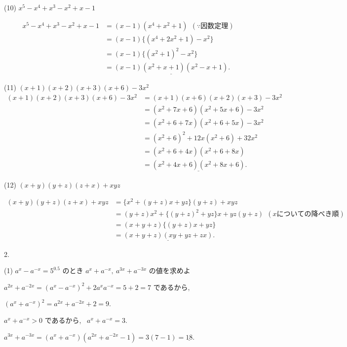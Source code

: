\documentclass[dvipdfmx]{jsarticle}
\begin{document}
\bigskip

(10) $x^5 - x^4 + x^3 - x^2 + x -1$

$$
\begin{aligned}
  x^5 - x^4 + x^3 - x^2 + x -1
  &= (x-1)(x^4 + x^2 + 1) \ \ (\because 因数定理) \\
  &= (x-1)\{(x^4 + 2x^2 + 1) - x^2 \} \\
  &= (x-1)\{(x^2 + 1)^2 - x^2 \} \\
  &= \underline{(x-1)(x^2 + x + 1)(x^2 - x + 1)}.
\end{aligned}
$$

\bigskip

(11) $(x+1)(x+2)(x+3)(x+6) - 3x^2$
$$
\begin{aligned}
  (x+1)(x+2)(x+3)(x+6) - 3x^2
  &= (x+1)(x+6)(x+2)(x+3) - 3x^2 \\
  &= (x^2 + 7x + 6)(x^2 + 5x + 6) -3x^2 \\
  &= (x^2 + 6 + 7x)(x^2 + 6 + 5x) - 3x^2 \\
  &= (x^2 + 6)^2 + 12x(x^2 + 6) +32x^2 \\
  &= (x^2 + 6 + 4x)(x^2 + 6 + 8x) \\
  &= \underline{(x^2 + 4x + 6)(x^2 + 8x + 6)}.
\end{aligned}
$$

\bigskip

(12) $(x+y)(y+z)(z+x) +xyz$

$$
\begin{aligned}
  (x+y)(y+z)(z+x) +xyz
  &= \{x^2 + (y+z)x + yz\}(y+z) + xyz \\
  &= (y+z)x^2 + \{(y+z)^2 + yz\}x + yz(y+z) \ \ (xについての降べき順) \\
  &= (x+y+z)\{(y+z)x  + yz\} \\
  &= \underline{(x+y+z)(xy + yz + zx)}.
\end{aligned}
$$


\newpage

2.

(1) $a^x - a^{-x} = 5^{0.5}$ のとき $a^x + a^{-x}, \ a^{3x} + a^{-3x}$ の値を求めよ

\bigskip

$a^{2x} + a^{-2x} = (a^x - a^{-x})^2 + 2a^x a^{-x} = 5 + 2 = 7$ であるから, \ 

$(a^x + a^{-x})^2 = a^{2x} + a^{-2x} + 2 = 9$.

$a^x + a^{-x} > 0$ であるから, \ \underline{$a^x + a^{-x} = 3$}.

$a^{3x} + a^{-3x} = (a^x + a^{-x})(a^{2x} + a^{-2x} - 1) = 3(7-1) = \underline{18}$.
\end{document}
